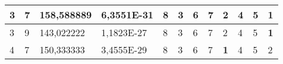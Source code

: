 \documentclass[conference]{IEEEtran}
\begin{document}
\begin{table*}[]
\begin{tabular}{|llll|llllllll|}
\multicolumn{1}{|l|}{3}                                                     & \multicolumn{1}{l|}{7}                                                        & \multicolumn{1}{l|}{158,588889}                                                   & 6,3551E-31                     & \multicolumn{1}{l|}{8}                                                  & \multicolumn{1}{l|}{3}                                                  & \multicolumn{1}{l|}{6}                                                  & \multicolumn{1}{l|}{7}                                                  & \multicolumn{1}{l|}{2}                                                  & \multicolumn{1}{l|}{4}                                                  & \multicolumn{1}{l|}{5}                                                  & \textbf{1}                 \\ \hline
\multicolumn{1}{|l|}{3}                                                     & \multicolumn{1}{l|}{9}                                                        & \multicolumn{1}{l|}{143,022222}                                                   & 1,1823E-27                     & \multicolumn{1}{l|}{8}                                                  & \multicolumn{1}{l|}{3}                                                  & \multicolumn{1}{l|}{6}                                                  & \multicolumn{1}{l|}{7}                                                  & \multicolumn{1}{l|}{2}                                                  & \multicolumn{1}{l|}{4}                                                  & \multicolumn{1}{l|}{5}                                                  & \textbf{1}                 \\ \hline
\multicolumn{1}{|l|}{4}                                                     & \multicolumn{1}{l|}{7}                                                        & \multicolumn{1}{l|}{150,333333}                                                   & 3,4555E-29                     & \multicolumn{1}{l|}{8}                                                  & \multicolumn{1}{l|}{3}                                                  & \multicolumn{1}{l|}{6}                                                  & \multicolumn{1}{l|}{7}                                                  & \multicolumn{1}{l|}{\textbf{1}}                                         & \multicolumn{1}{l|}{4}                                                  & \multicolumn{1}{l|}{5}                                                  & 2                          \\ \hline

\end{tabular}
\end{table*}
\end{document}
